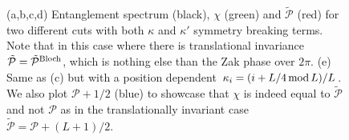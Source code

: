 \documentclass[twocolumn,amsmath,longbibliography,amssymb,superscriptaddress]{revtex4-1}
\begin{document}
\begin{figure}[t]
	\centering
	\hspace{0mm}
	
	\hspace{0mm}
	
	\caption{(a,b,c,d) Entanglement spectrum (black), $\chi$ (green) and $\tilde{\mathcal{P}}$ (red) for two different cuts with both $\kappa$ and $\kappa'$ symmetry breaking terms. Note that in this case where there is translational invariance $\tilde{\mathcal{P}}=\tilde{\mathcal{P}}^{\rm Bloch}$, which is nothing else than the Zak phase over $2\pi$. (e) Same as (c) but with a position dependent $\kappa_i=(i+L/4 \, {\rm mod}\, L)/L$. We also plot $\mathcal{P}+1/2$ (blue) to showcase that $\chi$ is indeed equal to $\tilde{\mathcal{P}}$ and not $\mathcal{P}$ as in the translationally invariant case $\tilde{\mathcal{P}}=\mathcal{P}+(L+1)/2$. }
	\label{2}
\end{figure}
\end{document}
